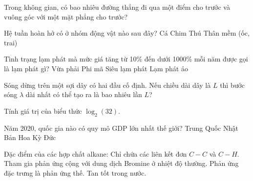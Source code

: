 \begin{ex}
    Trong không gian, có bao nhiêu đường thẳng đi qua một điểm cho trước và vuông góc với một mặt phẳng cho trước?
\end{ex}

\begin{ex}
    Hệ tuần hoàn hở có ở nhóm động vật nào sau đây?
    \choice
    {Cá}
    {Chim}
    {Thú}
    {\True Thân mềm (ốc, trai)}
\end{ex}

\begin{ex}
    Tình trạng lạm phát mà mức giá tăng từ 10\% đến dưới 1000\% mỗi năm được gọi là lạm phát gì?
    \choice
    {Vừa phải}
    {\True Phi mã}
    {Siêu lạm phát}
    {Lạm phát ảo}
\end{ex}

\begin{ex}
    Sóng dừng trên một sợi dây có hai đầu cố định. Nếu chiều dài dây là $L$ thì bước sóng $\lambda$ dài nhất có thể tạo ra là bao nhiêu lần $L$?
\end{ex}

\begin{ex}
    Tính giá trị của biểu thức $\log_2(32)$.
\end{ex}

\begin{ex}
    Năm 2020, quốc gia nào có quy mô GDP lớn nhất thế giới?
    \choice
    {Trung Quốc}
    {Nhật Bản}
    {\True Hoa Kỳ}
    {Đức}
\end{ex}

\begin{ex}
    Đặc điểm của các hợp chất alkane:
    \choiceTF
    {\True Chỉ chứa các liên kết đơn $C-C$ và $C-H$.}
    {Tham gia phản ứng cộng với dung dịch Bromine ở nhiệt độ thường.}
    {\True Phản ứng đặc trưng là phản ứng thế.}
    {Tan tốt trong nước.}
\end{ex}

